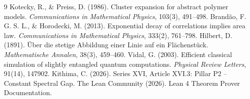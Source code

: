 \documentclass[11pt,a4paper]{article}
\begin{document}

\begin{thebibliography}{9}
  Kotecky, R., \& Preiss, D. (1986). Cluster expansion for abstract polymer models. \emph{Communications in Mathematical Physics}, 103(3), 491–498.
  Brandão, F. G. S. L., \& Horodecki, M. (2013). Exponential decay of correlations implies area law. \emph{Communications in Mathematical Physics}, 333(2), 761–798.
  Hilbert, D. (1891). Über die stetige Abbildung einer Linie auf ein Flächenstück. \emph{Mathematische Annalen}, 38(3), 459–460.
  Vidal, G. (2003). Efficient classical simulation of slightly entangled quantum computations. \emph{Physical Review Letters}, 91(14), 147902.
  Kithima, C. (2026). Series XVI, Article XVI.3: Pillar P2 – Constant Spectral Gap.
  The Lean Community (2026). Lean 4 Theorem Prover Documentation.
\end{thebibliography}
\end{document}
